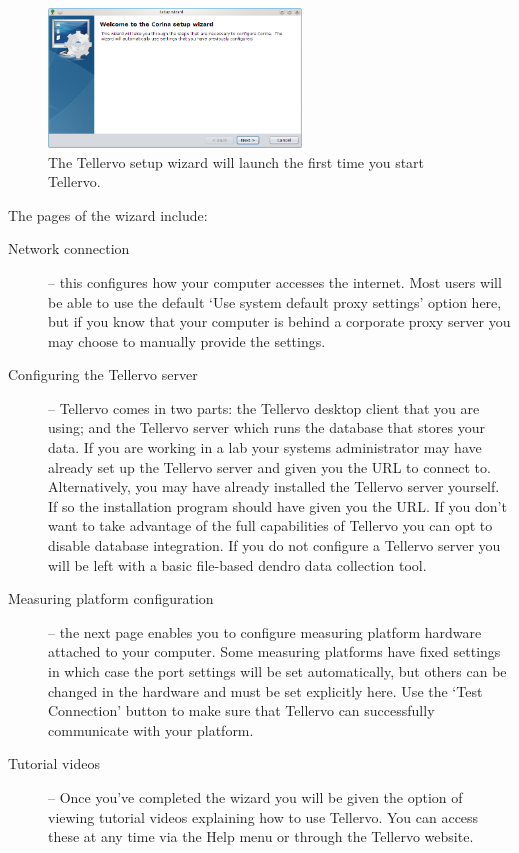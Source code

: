 \begin{figure}[hbtp]
  \centering
    \includegraphics[width=0.6\textwidth]{Images/setupwizard.png}
  \caption{The Tellervo setup wizard will launch the first time you start Tellervo.}
  \label{fig:setupwizard}
\end{figure}

The pages of the wizard include:

\begin{description}
 \item[Network connection] -- this configures how your computer accesses the internet.  Most users will be able to use the default `Use system default proxy settings' option here, but if you know that your computer is behind a corporate proxy server you may choose to manually provide the settings.
 \item[Configuring the Tellervo server] -- Tellervo comes in two parts: the Tellervo desktop client that you are using; and the Tellervo server which runs the database that stores your data.  If you are working in a lab your systems administrator may have already set up the Tellervo server and given you the URL to connect to.  Alternatively, you may have already installed the Tellervo server yourself.  If so the installation program should have given you the URL. If you don't want to take advantage of the full capabilities of Tellervo you can opt to disable database integration.  If you do not configure a Tellervo server you will be left with a basic file-based dendro data collection tool.
 \item[Measuring platform configuration] -- the next page enables you to configure measuring platform hardware attached to your computer.  Some measuring platforms have fixed settings in which case the port settings will be set automatically, but others can be changed in the hardware and must be set explicitly here. Use the `Test Connection' button to make sure that Tellervo can successfully communicate with your platform.
 \item[Tutorial videos] -- Once you've completed the wizard you will be given the option of viewing tutorial videos explaining how to use Tellervo.  You can access these at any time via the Help menu or through the Tellervo website.
\end{description}



